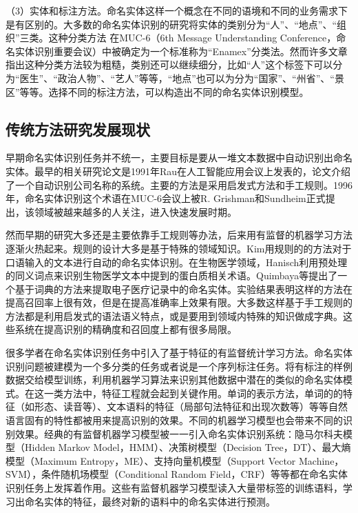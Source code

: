 \documentclass[winfonts,master,oneside,nobackinfo]{njuthesis}
\begin{document}
（3）实体和标注方法。命名实体这样一个概念在不同的语境和不同的业务需求下是有区别的。大多数的命名实体识别的研究将实体的类别分为“人”、“地点”、“组织”三类。这种分类方法 在MUC-6（6th Message Understanding Conference，命名实体识别重要会议）中被确定为一个标准称为“Enamex”分类法。然而许多文章指出这种分类方法较为粗糙，类别还可以继续细分，比如“人”这个标签下可以分为“医生”、“政治人物”、“艺人”等等，“地点”也可以为分为“国家”、“州省”、“景区”等等。选择不同的标注方法，可以构造出不同的命名实体识别模型。

\subsection{传统方法研究发展现状}
早期命名实体识别任务并不统一，主要目标是要从一堆文本数据中自动识别出命名实体。最早的相关研究论文是1991年Rau\cite{Rau}在人工智能应用会议上发表的，论文介绍了一个自动识别公司名称的系统。主要的方法是采用启发式方法和手工规则。1996年，命名实体识别这个术语在MUC-6会议上被R. Grishman和Sundheim正式提出，该领域被越来越多的人关注，进入快速发展时期。

然而早期的研究大多还是主要依靠手工规则等办法，后来用有监督的机器学习方法逐渐火热起来。规则的设计大多是基于特殊的领域知识。Kim\cite{Kim}用规则的的方法对于口语输入的文本进行自动的命名实体识别。在生物医学领域，Hanisch\cite{Hanisch}利用预处理的同义词点来识别生物医学文本中提到的蛋白质相关术语。Quimbaya\cite{Quimbaya}等提出了一个基于词典的方法来提取电子医疗记录中的命名实体。实验结果表明这样的方法在提高召回率上很有效，但是在提高准确率上效果有限。大多数这样基于手工规则的方法都是利用启发式的语法语义特点，或是要用到领域内特殊的知识做成字典。这些系统在提高识别的精确度和召回度上都有很多局限。

很多学者在命名实体识别任务中引入了基于特征的有监督统计学习方法。命名实体识别问题被建模为一个多分类的任务或者说是一个序列标注任务。将有标注的样例数据交给模型训练，利用机器学习算法来识别其他数据中潜在的类似的命名实体模式。在这一类方法中，特征工程就会起到关键作用。单词的表示方法\cite{Nadeau}，单词的的特征（如形态、读音等）\cite{Settles}、文本语料的特征（局部句法特征和出现次数等）\cite{Ravin}等等自然语言固有的特性都被用来提高识别的效果。不同的机器学习模型也会带来不同的识别效果。经典的有监督机器学习模型被一一引入命名实体识别系统：隐马尔科夫模型（Hidden Markov Model，HMM）\cite{Eddy}、决策树模型（Decision Tree，DT）\cite{Quinlan}、最大熵模型（Maximum Entropy，ME）\cite{Kapur}、支持向量机模型（Support Vector Machine，SVM）\cite{Hearst}，条件随机场模型（Conditional Random Field，CRF）\cite{Lafferty}等等都在命名实体识别任务上发挥着作用。这些有监督机器学习模型读入大量带标签的训练语料，学习出命名实体的特征，最终对新的语料中的命名实体进行预测。
\end{document}
